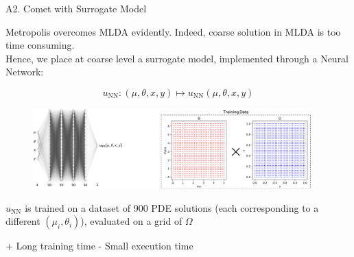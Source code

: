 \documentclass[10pt, a4paper]{beamer}
\begin{document}
	\begin{frame}{A2. Comet with Surrogate Model}
		
		Metropolis overcomes MLDA evidently. Indeed, coarse solution in MLDA is too time consuming. \\
		
		Hence, we place at coarse level a surrogate model, implemented through a Neural Network:
		
		\begin{equation*}
			u_{\text{NN}}: (\mu,\theta,x,y) \mapsto u_{\text{NN}}(\mu,\theta,x,y)
		\end{equation*}
	
		\begin{figure}[H]
			\includegraphics[height = 3.1cm]{Surrogate_Images}
		\end{figure}

		$u_{\text{NN}}$ is trained on a dataset of 900 PDE solutions (each corresponding to a different $(\mu_i,\theta_i)$), evaluated on a grid of $\Omega$
	
		\begin{center}
			+ Long training time	 \hspace{2cm}	- Small execution time
		\end{center}
		
	\end{frame}
\end{document}
